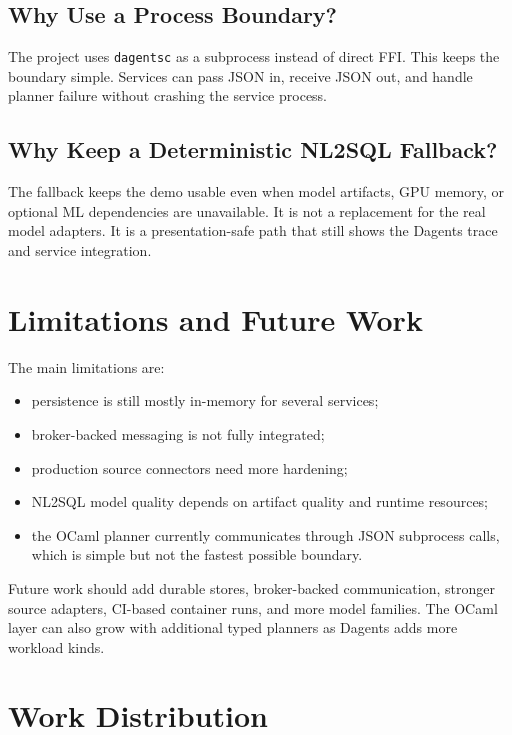 \documentclass[conference]{IEEEtran}
\begin{document}
\subsection{Why Use a Process Boundary?}

The project uses \texttt{dagentsc} as a subprocess instead of direct FFI. This
keeps the boundary simple. Services can pass JSON in, receive JSON out, and
handle planner failure without crashing the service process.

\subsection{Why Keep a Deterministic NL2SQL Fallback?}

The fallback keeps the demo usable even when model artifacts, GPU memory, or
optional ML dependencies are unavailable. It is not a replacement for the real
model adapters. It is a presentation-safe path that still shows the Dagents
trace and service integration.

\section{Limitations and Future Work}

The main limitations are:

\begin{itemize}
  \item persistence is still mostly in-memory for several services;
  \item broker-backed messaging is not fully integrated;
  \item production source connectors need more hardening;
  \item NL2SQL model quality depends on artifact quality and runtime resources;
  \item the OCaml planner currently communicates through JSON subprocess calls,
  which is simple but not the fastest possible boundary.
\end{itemize}

Future work should add durable stores, broker-backed communication, stronger
source adapters, CI-based container runs, and more model families. The OCaml
layer can also grow with additional typed planners as Dagents adds more
workload kinds.

\section{Work Distribution}
\end{document}

